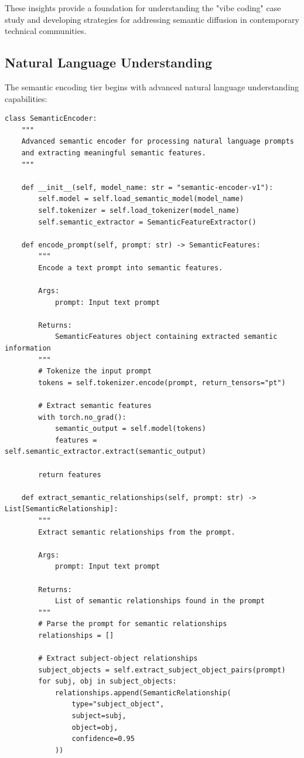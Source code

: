 \documentclass[11pt]{article}
\begin{document}
These insights provide a foundation for understanding the "vibe coding" case study and developing strategies for addressing semantic diffusion in contemporary technical communities.

\subsection{Natural Language Understanding}

The semantic encoding tier begins with advanced natural language understanding capabilities:

\begin{lstlisting}[style=python]
class SemanticEncoder:
    """
    Advanced semantic encoder for processing natural language prompts
    and extracting meaningful semantic features.
    """
    
    def __init__(self, model_name: str = "semantic-encoder-v1"):
        self.model = self.load_semantic_model(model_name)
        self.tokenizer = self.load_tokenizer(model_name)
        self.semantic_extractor = SemanticFeatureExtractor()
    
    def encode_prompt(self, prompt: str) -> SemanticFeatures:
        """
        Encode a text prompt into semantic features.
        
        Args:
            prompt: Input text prompt
            
        Returns:
            SemanticFeatures object containing extracted semantic information
        """
        # Tokenize the input prompt
        tokens = self.tokenizer.encode(prompt, return_tensors="pt")
        
        # Extract semantic features
        with torch.no_grad():
            semantic_output = self.model(tokens)
            features = self.semantic_extractor.extract(semantic_output)
        
        return features
    
    def extract_semantic_relationships(self, prompt: str) -> List[SemanticRelationship]:
        """
        Extract semantic relationships from the prompt.
        
        Args:
            prompt: Input text prompt
            
        Returns:
            List of semantic relationships found in the prompt
        """
        # Parse the prompt for semantic relationships
        relationships = []
        
        # Extract subject-object relationships
        subject_objects = self.extract_subject_object_pairs(prompt)
        for subj, obj in subject_objects:
            relationships.append(SemanticRelationship(
                type="subject_object",
                subject=subj,
                object=obj,
                confidence=0.95
            ))
        

\end{lstlisting}
\end{document}

